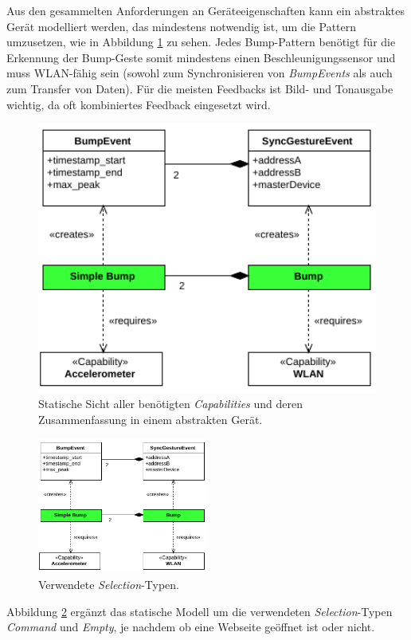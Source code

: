 Aus den gesammelten Anforderungen an Geräteeigenschaften kann ein abstraktes Gerät modelliert werden, das mindestens notwendig ist, um die Pattern umzusetzen, wie in Abbildung \ref{fig:bump_dm_device} zu sehen. Jedes Bump-Pattern benötigt für die Erkennung der Bump-Geste somit mindestens einen Beschleunigungssensor und muss WLAN-fähig sein (sowohl zum Synchronisieren von \textit{BumpEvents} als auch zum Transfer von Daten). Für die meisten Feedbacks ist Bild- und Tonausgabe wichtig, da oft kombiniertes Feedback eingesetzt wird.

\begin{figure}[h!]
\centering
\includegraphics[page=3,width=1\textwidth]{bilder/bump/domain_model}
\caption{Statische Sicht aller benötigten \textit{Capabilities} und deren Zusammenfassung in einem abstrakten Gerät.}
\label{fig:bump_dm_device}
\end{figure}

\begin{figure}[h!]
\centering
\includegraphics[page=4,width=0.5\textwidth]{bilder/bump/domain_model}
\caption{Verwendete \textit{Selection}-Typen.}
\label{fig:bump_dm_selection}
\end{figure}
Abbildung \ref{fig:bump_dm_selection} ergänzt das statische Modell um die verwendeten \textit{Selection}-Typen \textit{Command} und \textit{Empty}, je nachdem ob eine Webseite geöffnet ist oder nicht.

